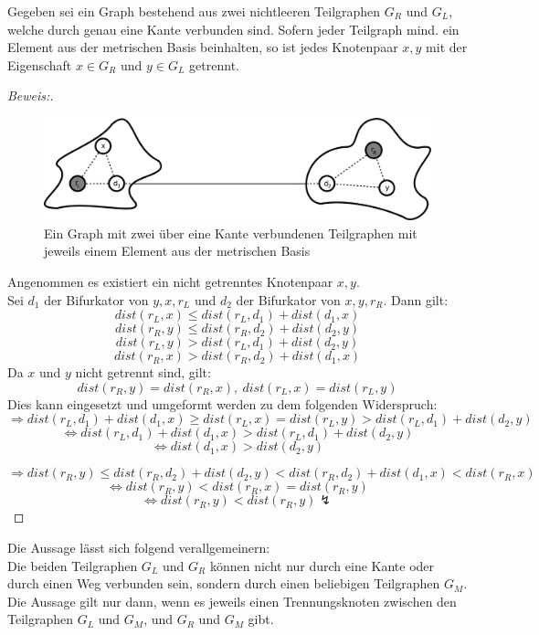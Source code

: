 \begin{lem}
\label{first_theorem}
Gegeben sei ein Graph bestehend aus zwei nichtleeren Teilgraphen $G_R$ und $G_L$, welche durch genau eine Kante verbunden sind. Sofern jeder Teilgraph mind. ein Element aus der metrischen Basis beinhalten, so ist jedes Knotenpaar $x,y$ mit der Eigenschaft $x \in G_R$ und $y \in G_L$ getrennt.
\end{lem}
\begin{proof}[Beweis:] ~
\begin{figure}[h!]
		\centering 		 
  \includegraphics[width=420pt]{bilder/bew5.pdf}
	\caption{Ein Graph mit zwei über eine Kante verbundenen Teilgraphen mit jeweils einem Element aus der metrischen Basis}
  	 \end{figure}
  Angenommen es existiert ein nicht getrenntes Knotenpaar $x,y$.\\Sei $d_1$ der Bifurkator von $y,x,r_L$ und $d_2$ der Bifurkator von $x,y,r_R$. Dann gilt: $$dist(r_L,x) \leq dist(r_L,d_1)+ dist(d_1,x)$$ $$dist(r_R,y) \leq dist(r_R,d_2)+ dist(d_2,y)$$ $$dist(r_L,y) > dist(r_L,d_1)+ dist(d_2,y)$$ $$dist(r_R,x) > dist(r_R,d_2)+ dist(d_1,x)$$
  Da $x$ und $y$ nicht getrennt sind, gilt:
   $$dist(r_R,y) =dist(r_R,x),\: dist(r_L,x) = dist(r_L,y)$$ Dies kann eingesetzt und umgeformt werden zu dem folgenden Widerspruch:
  $$\Rightarrow dist(r_L,d_1)+ dist(d_1,x) \geq dist(r_L,x) = dist(r_L,y)> dist(r_L,d_1)+ dist(d_2,y)$$
  $$\Leftrightarrow dist(r_L,d_1)+ dist(d_1,x) > dist(r_L,d_1)+ dist(d_2,y)$$
  $$\Leftrightarrow dist(d_1,x) >  dist(d_2,y)$$
  
  $$\Rightarrow dist(r_R,y) \leq dist(r_R,d_2)+ dist(d_2,y) < dist(r_R,d_2) + dist(d_1,x) < dist(r_R,x)$$
  $$\Leftrightarrow dist(r_R,y) < dist(r_R,x) = dist(r_R,y)$$
  $$\Leftrightarrow dist(r_R,y) < dist(r_R,y) \lightning $$  
  \end{proof}
  \begin{bem}
  \label{aussagetrennungsgraphen}
  Die Aussage lässt sich folgend verallgemeinern:\\
  Die beiden Teilgraphen $G_L$ und $G_R$ können nicht nur durch eine Kante oder durch einen Weg verbunden sein, sondern durch einen beliebigen Teilgraphen $G_M$. Die Aussage gilt nur dann, wenn es jeweils einen Trennungsknoten zwischen den Teilgraphen $G_L$ und $G_M$, und $G_R$ und $G_M$ gibt.
  \end{bem}
